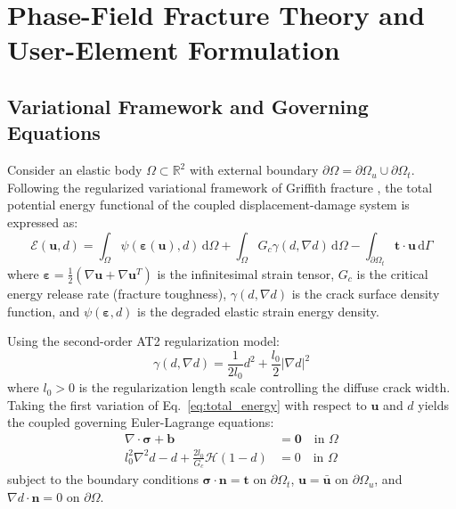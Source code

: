 \documentclass[11pt,a4paper]{report}
\begin{document}
\chapter{Phase-Field Fracture Theory and User-Element Formulation}
\label{chap:theory}

\section{Variational Framework and Governing Equations}
Consider an elastic body $\Omega \subset \mathbb{R}^2$ with external boundary $\partial\Omega = \partial\Omega_u \cup \partial\Omega_t$. Following the regularized variational framework of Griffith fracture \cite{bourdin2000, miehe2010}, the total potential energy functional of the coupled displacement-damage system is expressed as:
\begin{equation}
\label{eq:total_energy}
\mathcal{E}(\mathbf{u}, d) = \int_{\Omega} \psi(\boldsymbol{\varepsilon}(\mathbf{u}), d) \, \mathrm{d}\Omega + \int_{\Omega} G_c \gamma(d, \nabla d) \, \mathrm{d}\Omega - \int_{\partial\Omega_t} \mathbf{t} \cdot \mathbf{u} \, \mathrm{d}\Gamma
\end{equation}
where $\boldsymbol{\varepsilon} = \frac{1}{2}(\nabla\mathbf{u} + \nabla\mathbf{u}^T)$ is the infinitesimal strain tensor, $G_c$ is the critical energy release rate (fracture toughness), $\gamma(d, \nabla d)$ is the crack surface density function, and $\psi(\boldsymbol{\varepsilon}, d)$ is the degraded elastic strain energy density.

Using the second-order AT2 regularization model:
\begin{equation}
\label{eq:crack_density}
\gamma(d, \nabla d) = \frac{1}{2 l_0} d^2 + \frac{l_0}{2} |\nabla d|^2
\end{equation}
where $l_0 > 0$ is the regularization length scale controlling the diffuse crack width. Taking the first variation of Eq.~\eqref{eq:total_energy} with respect to $\mathbf{u}$ and $d$ yields the coupled governing Euler-Lagrange equations:
\begin{align}
\label{eq:el_disp}
\nabla \cdot \boldsymbol{\sigma} + \mathbf{b} &= \mathbf{0} \quad \text{in } \Omega \\
\label{eq:el_phase}
l_0^2 \nabla^2 d - d + \frac{2 l_0}{G_c} \mathcal{H}(1 - d) &= 0 \quad \text{in } \Omega
\end{align}
subject to the boundary conditions $\boldsymbol{\sigma} \cdot \mathbf{n} = \mathbf{t}$ on $\partial\Omega_t$, $\mathbf{u} = \bar{\mathbf{u}}$ on $\partial\Omega_u$, and $\nabla d \cdot \mathbf{n} = 0$ on $\partial\Omega$.
\end{document}
